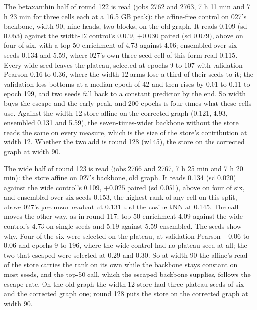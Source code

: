 The betaxanthin half of round 122 is read (jobs 2762 and 2763, 7 h 11 min and 7 h 23
min for three cells each at a 16.5 GB peak): the affine-free control on 027's backbone,
width 90, nine heads, two blocks, on the old graph. It reads 0.109 (sd 0.053) against
the width-12 control's 0.079, $+0.030$ paired (sd 0.079), above on four of six, with a
top-50 enrichment of 4.73 against 4.06; ensembled over six seeds 0.134 and 5.59, where
027's own three-seed cell of this form read 0.115. Every wide seed leaves the plateau,
selected at epochs 9 to 107 with validation Pearson 0.16 to 0.36, where the width-12
arms lose a third of their seeds to it; the validation loss bottoms at a median epoch of
42 and then rises by 0.01 to 0.11 to epoch 199, and two seeds fall back to a constant
predictor by the end. So width buys the escape and the early peak, and 200 epochs is
four times what these cells use. Against the width-12 store affine on the corrected
graph (0.121, 4.93, ensembled 0.131 and 5.59), the seven-times-wider backbone without
the store reads the same on every measure, which is the size of the store's
contribution at width 12. Whether the two add is round 128 (w145), the store on the
corrected graph at width 90.

The wide half of round 123 is read (jobs 2766 and 2767, 7 h 25 min and 7 h 20 min):
the store affine on 027's backbone, old graph. It reads 0.134 (sd 0.020) against the
wide control's 0.109, $+0.025$ paired (sd 0.051), above on four of six, and ensembled
over six seeds 0.153, the highest rank of any cell on this split, above 027's precursor
readout at 0.131 and the cosine kNN at 0.145. The call moves the other way, as in round
117: top-50 enrichment 4.09 against the wide control's 4.73 on single seeds and 5.19
against 5.59 ensembled. The seeds show why. Four of the six were selected on the plateau,
at validation Pearson $-0.06$ to $0.06$ and epochs 9 to 196, where the wide control had
no plateau seed at all; the two that escaped were selected at 0.29 and 0.30. So at width
90 the affine's read of the store carries the rank on its own while the backbone stays
constant on most seeds, and the top-50 call, which the escaped backbone supplies,
follows the escape rate. On the old graph the width-12 store had three plateau seeds of
six and the corrected graph one; round 128 puts the store on the corrected graph at
width 90.

